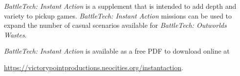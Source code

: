 \emph{BattleTech: Instant Action} is a supplement that is intended to add depth and variety to pickup games.
\emph{BattleTech: Instant Action} missions can be used to expand the number of casual scenarios available for \emph{BattleTech: Outworlds Wastes}.

\emph{BattleTech: Instant Action} is available as a free PDF to download online at

 \href{https://victorypointproductions.neocities.org/instantaction}{https://victorypointproductions.neocities.org/instantaction}.
